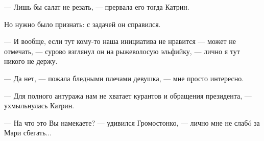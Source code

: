 --- Лишь бы салат не резать, --- прервала его тогда Катрин.

Но нужно было признать: с задачей он справился.

--- И вообще, если тут кому-то наша инициатива не нравится --- может не отмечать, ---
сурово взглянул он на рыжеволосую эльфийку, --- лично я тут никого не держу.

--- Да нет, --- пожала бледными плечами девушка, --- мне просто интересно.

--- Для полного антуража нам не хватает курантов и обращения президента, --- ухмыльнулась Катрин.

--- На что это Вы намекаете? --- удивился Громостонко, --- лично мне не слаб\'o за Мари сбегать...

\emptypar

\emptypar
